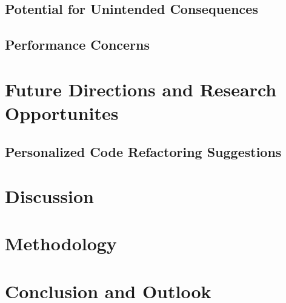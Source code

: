 \documentclass[conference]{IEEEtran}
\begin{document}
\subsection{Potential for Unintended Consequences}
\subsection{Performance Concerns}

\section{Future Directions and Research Opportunites}
\subsection{Personalized Code Refactoring Suggestions}
\section{Discussion}


\section{Methodology}

\section{Conclusion and Outlook}

\end{document}
